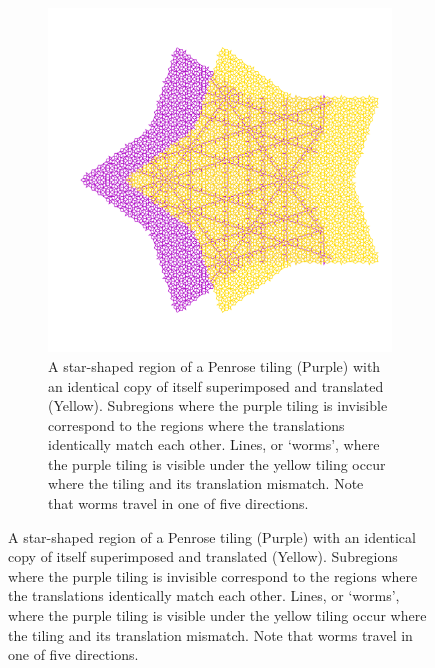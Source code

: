\documentclass[
  oneside,
  11pt, a4paper,
  footinclude=true,
  headinclude=true,
  cleardoublepage=empty
]{scrbook}
\begin{document}
\begin{figure}[h]
\centering
\begin{subfigure}{0.8\textwidth}
\includegraphics[width=\textwidth]{reTranslateFar}
\caption{A star-shaped region of a Penrose tiling (Purple) with an identical copy of itself superimposed and translated (Yellow). Subregions where the purple tiling is invisible correspond to the regions where the translations identically match each other. Lines, or `worms', where the purple tiling is visible under the yellow tiling occur where the tiling and its translation mismatch. Note that worms travel in one of five directions.}
\label{fig:far}
\end{subfigure}


\end{figure}
\end{document}
